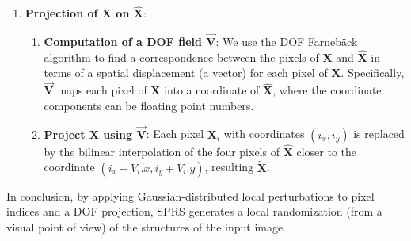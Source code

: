 \begin{subappendices}
\begin{enumerate}
\item \textbf{Projection of $\mathbf{X}$ on $\hat{\mathbf{X}}$}:
  \begin{enumerate}
  \item \textbf{Computation of a \gls{DOF} field
      $\overrightarrow{\mathbf{V}}$}: We use the \gls{DOF} Farneb\"ack
    algorithm \cite{farneback2003two} to find a correspondence between
    the pixels of $\mathbf{X}$ and $\hat{\mathbf{X}}$ in terms of a
    spatial displacement (a vector) for each pixel of
    $\mathbf{X}$. Specifically, $\overrightarrow{\mathbf{V}}$ maps each
    pixel of $\mathbf{X}$ into a coordinate of $\hat{\mathbf{X}}$,
    where the coordinate components can be floating point numbers.
  \item \textbf{Project $\mathbf{X}$ using
      $\overrightarrow{\mathbf{V}}$}: Each pixel $\mathbf{X}_i$
    with coordinates $(i_x, i_y)$ is replaced by the bilinear
    interpolation of the four pixels of $\hat{\mathbf{X}}$ closer to
    the coordinate $(i_x+V_i.x,i_y+V_i.y)$, resulting
    $\tilde{\mathbf{X}}$.
  \end{enumerate}
\end{enumerate}

In conclusion, by applying Gaussian-distributed local perturbations to
pixel indices and a \gls{DOF} projection, \gls{SPRS} generates a local
randomization (from a visual point of view) of the structures of the
input image.


\begin{comment}
\section{If $\mathbb{E}(\mathbf{n})=0$, then $\mathbb{E}(\mathbf{s}^2)=\mathbb{E}(\hat{\mathbf{s}}^2)$}
\label{sec:power_signal}
If $\mathbb{E}(\mathbf{n})=0$, the power of the clean signal is the
same than the power of the noisy signal:

\begin{alignat*}{2}
  P(\mathbf{s}) & = \mathbb{E}(\mathbf{s}^2) \\
                & = \mathbb{E}\left((\mathbf{n}+\hat{\mathbf{s}})^2\right) \\
                & = \mathbb{E}(\mathbf{n}^2+2\mathbf{n}\mathbf{s}+\hat{\mathbf{s}}^2) \\
                & = \mathbb{E}(\mathbf{n}^2) + 2\mathbb{E}(\mathbf{n})\mathbb{E}(\hat{\mathbf{s}}) + \mathbb{E}(\hat{\mathbf{s}}^2) \\
                & = \mathbb{E}(\hat{\mathbf{s}}^2) = P(\hat{\mathbf{s}}).
\end{alignat*}


\end{comment}
\end{subappendices}
